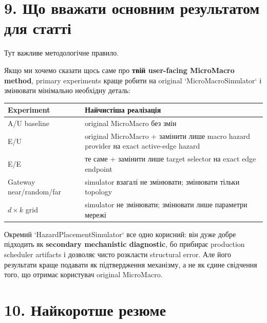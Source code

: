 \documentclass[11pt,a4paper]{article}
\begin{document}
\section*{9. Що вважати основним результатом для статті}

Тут важливе методологічне правило.

Якщо ми хочемо сказати щось саме про \textbf{твій user-facing MicroMacro method}, primary experiments краще робити на original `MicroMacroSimulator` і змінювати мінімально необхідну деталь:

\begin{center}
\begin{tabular}{p{35mm} p{107mm}}
\toprule
\textbf{Experiment} & \textbf{Найчистіша реалізація}\\
\midrule
A/U baseline & original MicroMacro без змін\\
E/U & original MicroMacro + замінити лише macro hazard provider на exact active-edge hazard\\
E/E & те саме + замінити лише target selector на exact edge endpoint\\
Gateway near/random/far & simulator взагалі не змінювати; змінювати тільки topology\\
$d\times k$ grid & simulator не змінювати; змінювати лише параметри мережі\\
\bottomrule
\end{tabular}
\end{center}

Окремий `HazardPlacementSimulator` все одно корисний: він дуже добре підходить як \textbf{secondary mechanistic diagnostic}, бо прибирає production scheduler artifacts і дозволяє чисто розкласти structural error. Але його результати краще подавати як підтвердження механізму, а не як єдине свідчення того, що отримає користувач original MicroMacro.

\section*{10. Найкоротше резюме}
\end{document}
